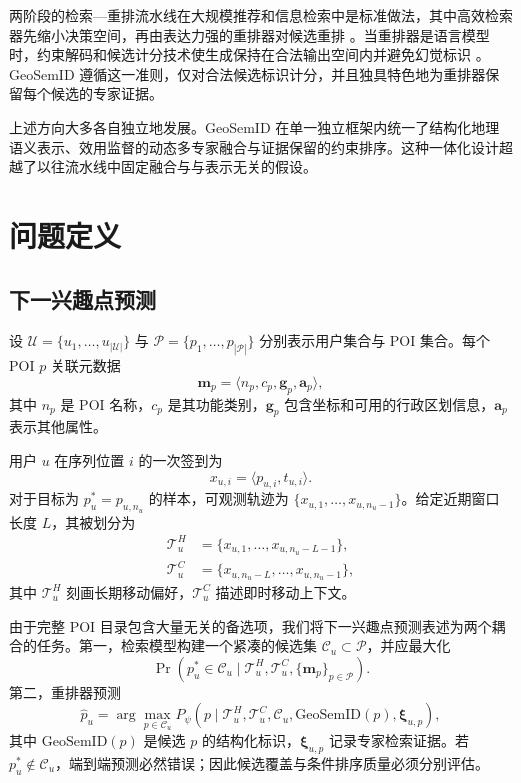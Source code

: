 \documentclass[10pt,fontset=none,twocolumn]{ctexart}
\newcommand{\gsid}{\mathrm{GeoSemID}}
\newcommand{\POIs}{\mathcal{P}}
\newcommand{\Users}{\mathcal{U}}
\begin{document}
两阶段的检索—重排流水线在大规模推荐和信息检索中是标准做法，其中高效检索器先缩小决策空间，再由表达力强的重排器对候选重排 \cite{covington2016youtube,karpukhin2020dpr,khattab2020colbert,nogueira2019bertrerank}。当重排器是语言模型时，约束解码和候选计分技术使生成保持在合法输出空间内并避免幻觉标识 \cite{holtzman2020curious,post2018constrained,decao2021genre,geng2023grammar}。GeoSemID 遵循这一准则，仅对合法候选标识计分，并且独具特色地为重排器保留每个候选的专家证据。

上述方向大多各自独立地发展。GeoSemID 在单一独立框架内统一了结构化地理语义表示、效用监督的动态多专家融合与证据保留的约束排序。这种一体化设计超越了以往流水线中固定融合与与表示无关的假设。

\section{问题定义}
\label{sec:problem}

\subsection{下一兴趣点预测}

设 $\Users=\{u_1,\ldots,u_{|\Users|}\}$ 与 $\POIs=\{p_1,\ldots,p_{|\POIs|}\}$ 分别表示用户集合与 POI 集合。每个 POI $p$ 关联元数据
\begin{equation}
\bm{m}_{p}
=
\langle n_p,c_p,\bm{g}_p,\bm{a}_p\rangle,
\label{eq:poi_metadata}
\end{equation}
其中 $n_p$ 是 POI 名称，$c_p$ 是其功能类别，$\bm{g}_p$ 包含坐标和可用的行政区划信息，$\bm{a}_p$ 表示其他属性。

用户 $u$ 在序列位置 $i$ 的一次签到为
\begin{equation}
x_{u,i}=\langle p_{u,i},t_{u,i}\rangle.
\label{eq:checkin}
\end{equation}
对于目标为 $p_u^{*}=p_{u,n_u}$ 的样本，可观测轨迹为 $\{x_{u,1},\ldots,x_{u,n_u-1}\}$。给定近期窗口长度 $L$，其被划分为
\begin{align}
\mathcal{T}_{u}^{H}
&=
\{x_{u,1},\ldots,x_{u,n_u-L-1}\},
\label{eq:historical_trajectory}\\
\mathcal{T}_{u}^{C}
&=
\{x_{u,n_u-L},\ldots,x_{u,n_u-1}\},
\label{eq:current_trajectory}
\end{align}
其中 $\mathcal{T}_{u}^{H}$ 刻画长期移动偏好，$\mathcal{T}_{u}^{C}$ 描述即时移动上下文。

由于完整 POI 目录包含大量无关的备选项，我们将下一兴趣点预测表述为两个耦合的任务。第一，检索模型构建一个紧凑的候选集 $\mathcal{C}_u\subset\POIs$，并应最大化
\begin{equation}
\Pr(p_u^{*}\in\mathcal{C}_u
\mid
\mathcal{T}_{u}^{H},\mathcal{T}_{u}^{C},\{\bm{m}_p\}_{p\in\POIs}).
\label{eq:coverage_objective}
\end{equation}
第二，重排器预测
\begin{equation}
\widehat{p}_{u}
=
\arg\max_{p\in\mathcal{C}_u}
P_{\psi}
\left(
p\mid
\mathcal{T}_{u}^{H},
\mathcal{T}_{u}^{C},
\mathcal{C}_u,
\gsid(p),
\bm{\xi}_{u,p}
\right),
\label{eq:final_prediction}
\end{equation}
其中 $\gsid(p)$ 是候选 $p$ 的结构化标识，$\bm{\xi}_{u,p}$ 记录专家检索证据。若 $p_u^{*}\notin\mathcal{C}_u$，端到端预测必然错误；因此候选覆盖与条件排序质量必须分别评估。
\end{document}
